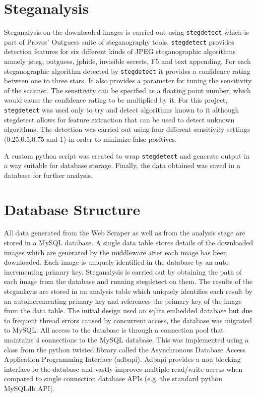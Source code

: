 \section {Steganalysis}
\label{sec:stegtool}
Steganalysis on the downloaded images is carried out using \texttt{stegdetect} which is part of Provos' Outguess suite of steganography tools. \texttt{stegdetect} provides detection features for six different kinds of JPEG steganographic algorithms namely jsteg, outguess, jphide, invisible secrets, F5 and text appending. For each steganographic algorithm detected by \texttt{stegdetect} it provides a confidence rating between one to three stars. It also provides a parameter for tuning the sensitivity of the scanner. The sensitivity can be specified as a floating point number, which would cause the confidence rating to be multiplied by it. For this project, \texttt{stegdetect} was used only to try and detect algorithms known to it although stegdetect allows for feature extraction that can be used to detect unknown algorithms. The detection was carried out using four different sensitivity settings (0.25,0.5,0.75 and 1) in order to minimize false positives.
\par A custom python script was created to wrap \texttt{stegdetect} and generate output in a way suitable for database storage. Finally, the data obtained was saved in a database for further analysis.
\section{Database Structure}
\label{sec:dbstructure}
All data generated from the Web Scraper as well as from the analysis stage are stored in a MySQL database. A single data table stores details of the downloaded images which are generated by the middleware after each image has been downloaded. Each image is uniquely identified in the database by an auto incrementing primary key. Steganalysis is carried out by obtaining the path of each image from the database and running stegdetect on them. The results of the stegnalayis are stored in an analysis table which uniquely identifies each result by an autoincrementing primary key and references the primary key of the image from the data table. The initial design used an sqlite embedded database but due to frequent thread errors caused by concurrent access, the database was migrated to MySQL. All access to the database is through a connection pool that maintains 4 connections to the MySQL database. This was implemented using a class from the python twisted library called the Asynchronous Database Access Application Programming Interface (adbapi). Adbapi provides a non blocking interface to the database and vastly improves multiple read/write access when compared to single connection database APIs (e.g. the standard python MySQLdb API). 

